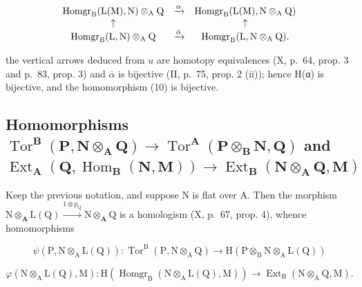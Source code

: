 \[
\begin{array}{c c c} \operatorname{Homgr} _ {\mathrm{B}} (\mathrm{L} (\mathrm{M}), \mathrm{N}) \otimes_ {\mathrm{A}} \mathrm{Q} & \xrightarrow {\alpha} & \operatorname{Homgr} _ {\mathrm{B}} (\mathrm{L} (\mathrm{M}), \mathrm{N} \otimes_ {\mathrm{A}} \mathrm{Q}) \\ \uparrow & & \uparrow \\ \operatorname{Homgr} _ {\mathrm{B}} (\mathrm{L}, \mathrm{N}) \otimes_ {\mathrm{A}} \mathrm{Q} & \xrightarrow {\bar {\alpha}} & \operatorname{Homgr} _ {\mathrm{B}} (\mathrm{L}, \mathrm{N} \otimes_ {\mathrm{A}} \mathrm{Q}). \end{array}
\]

the vertical arrows deduced from \(u\) are homotopy equivalences (X, p.~64, prop. 3 and p.~83, prop. 3) and \(\overline{\alpha}\) is bijective (II, p.~75, prop. 2 (ii)); hence H(α) is bijective, and the homomorphism (10) is bijective.

\subsection{\texorpdfstring{Homomorphisms \(\operatorname{Tor}^{\mathbf{B}}(\mathbf{P},\mathbf{N}\otimes_{\mathbf{A}}\mathbf{Q})\to \operatorname{Tor}^{\mathbf{A}}(\mathbf{P}\otimes_{\mathbf{B}}\mathbf{N},\mathbf{Q})\) and \(\operatorname{Ext}_{\mathbf{A}}(\mathbf{Q},\operatorname{Hom}_{\mathbf{B}}(\mathbf{N},\mathbf{M}))\to \operatorname{Ext}_{\mathbf{B}}(\mathbf{N}\otimes_{\mathbf{A}}\mathbf{Q},\mathbf{M})\)}{Change-of-rings homomorphisms for Tor and Ext}}

Keep the previous notation, and suppose N is flat over A. Then the morphism \(\mathrm{N}\otimes_{\mathbf{A}}\mathrm{L}(\mathrm{Q})\xrightarrow{\mathrm{1}\otimes p_{\mathrm{Q}}} \mathrm{N}\otimes_{\mathbf{A}}\mathrm{Q}\) is a homologism (X, p.~67, prop. 4), whence homomorphisms

\[
\psi (\mathrm{P}, \mathrm{N} \otimes_ {\mathrm{A}} \mathrm{L} (\mathrm{Q})): \operatorname{Tor} ^ {\mathrm{B}} (\mathrm{P}, \mathrm{N} \otimes_ {\mathrm{A}} \mathrm{Q}) \rightarrow \mathrm{H} (\mathrm{P} \otimes_ {\mathrm{B}} \mathrm{N} \otimes_ {\mathrm{A}} \mathrm{L} (\mathrm{Q}))
\]

\[
\varphi (\mathrm{N} \otimes_ {\mathrm{A}} \mathrm{L} (\mathrm{Q}), \mathrm{M}): \mathrm{H} (\operatorname{Homgr} _ {\mathrm{B}} (\mathrm{N} \otimes_ {\mathrm{A}} \mathrm{L} (\mathrm{Q}), \mathrm{M})) \rightarrow \operatorname{Ext} _ {\mathrm{B}} (\mathrm{N} \otimes_ {\mathrm{A}} \mathrm{Q}, \mathrm{M}).
\]

